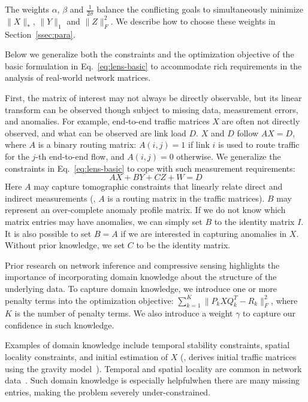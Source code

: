 \squishend

The weights $\alpha$, $\beta$ and $\frac{1}{2\sigma}$ balance the
conflicting goals to simultaneously minimize $\|X\|_*$, $\|Y\|_1$ and
$\|Z\|_F^2$.  We describe how to choose these weights in
Section~\ref{ssec:para}.  


 Below we generalize both the
constraints and the optimization objective of the basic formulation in
Eq.~\eqref{eq:lens-basic} to accommodate rich requirements in the
analysis of real-world network matrices.

  
First, the matrix of interest may not always be directly observable,
  but its linear transform can be observed though subject to missing
  data, measurement errors, and anomalies. For example, end-to-end
  traffic matrices $X$ are often not directly observed, and what can
  be observed are link load $D$. $X$ and $D$ follow $AX = D$, where
  $A$ is a binary routing matrix: $A(i,j) =
  1$ if link $i$ is used to route traffic for the $j$-th end-to-end
  flow, and $A(i,j) = 0$ otherwise.  We generalize the constraints in
  Eq.~\eqref{eq:lens-basic} to cope with such measurement
  requirements:
\begin{equation}
 AX + BY + CZ + W = D
\end{equation}
Here $A$ may capture tomographic constraints that linearly relate
direct and indirect measurements (\eg, 
$A$ is a routing matrix in the traffic matrices).  $B$ may represent an over-complete anomaly
profile matrix. If we do not know which matrix entries may have
anomalies, we can simply set $B$ to the identity matrix $I$. It is also
possible to set $B=A$ if we are interested in capturing anomalies in
$X$.  Without prior knowledge, we set $C$ to be the identity
matrix.



Prior research on network inference and compressive sensing
  highlights the importance of incorporating domain knowledge about
  the structure of the underlying data. To capture domain knowledge,
  we introduce one or more penalty terms into the
  optimization objective: $\sum_{k=1}^K \|P_k X Q_k^T - R_k\|_F^2$,
  where $K$ is the number of penalty terms.  We also introduce a
  weight $\gamma$ to capture our confidence in such knowledge.

Examples of domain knowledge include temporal stability constraints,
spatial locality constraints, and initial estimation of $X$ (\eg,
\cite{ZRDG03} derives initial traffic matrices using the gravity
model~\cite{gravity1}). Temporal and spatial locality are common 
in network data~\cite{anomaly_spatio_temporal,Wang:2002:model_spatio_temporal,George:2007:spatio_temporal_database}. Such domain knowledge is especially helpfulwhen there are many missing entries, making the problem severely
under-constrained.

